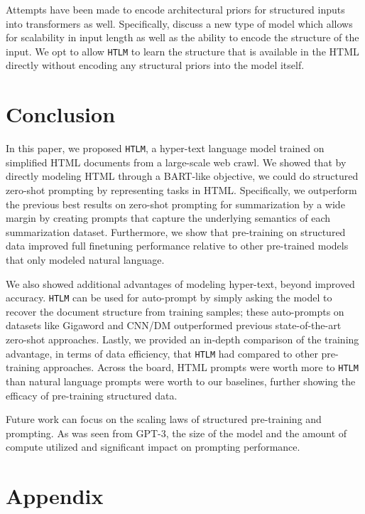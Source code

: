 \documentclass[11pt,a4paper]{article}
\newcommand{\HTLM}{\texttt{HTLM}}
\begin{document}
Attempts have been made to encode architectural priors for structured inputs into transformers as well. Specifically, \citet{etc_google} discuss a new type of model which allows for scalability in input length as well as the ability to encode the structure of the input. We opt to allow \HTLM{} to learn the structure that is available in the HTML directly without encoding any structural priors into the model itself.


\section{Conclusion}
In this paper, we proposed \HTLM{}, a hyper-text language model trained on simplified HTML documents from a large-scale web crawl. We showed that by directly modeling HTML through a BART-like objective, we could do structured zero-shot prompting by representing tasks in HTML. Specifically, we outperform the previous best results on zero-shot prompting for summarization by a wide margin by creating prompts that capture the underlying semantics of each summarization dataset. Furthermore, we show that pre-training on structured data improved full finetuning performance relative to other pre-trained models that only modeled natural language.

We also showed additional advantages of modeling hyper-text, beyond improved accuracy.  \HTLM{} can be used for auto-prompt  by simply asking the model to recover the document structure from training samples; these auto-prompts on datasets like Gigaword and CNN/DM outperformed previous state-of-the-art zero-shot approaches.
Lastly, we provided an in-depth comparison of the training advantage, in terms of data efficiency, that \HTLM{} had compared to other pre-training approaches. Across the board, HTML prompts were worth more to \HTLM{} than natural language prompts were worth to our baselines, further showing the efficacy of pre-training structured data.

Future work can focus on the scaling laws of structured pre-training and prompting. As was seen from GPT-3, the size of the model and the amount of compute utilized and significant impact on prompting performance.





\clearpage
\appendix
\section{Appendix}
\end{document}
